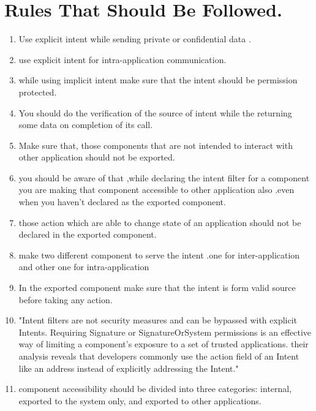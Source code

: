 \documentclass[11pt]{report}
\begin{document}
\section{Rules That Should Be Followed.}
\begin{enumerate}
\item Use explicit intent while sending private or confidential data .

\item use explicit intent for intra-application communication.

\item while using implicit intent make sure that the intent should be permission protected.

\item You should do the verification of the source of intent while the returning some data on completion of its call.

\item Make sure that, those components that are not intended to interact with  other application should not be exported. 

\item you should be aware of that ,while declaring the intent filter for a component you are making that component accessible
to other application also .even when you haven't declared as the exported component.

\item those action which are able to change state of an application should not be declared in the exported component.

\item make two different component to serve the intent .one for inter-application and other one for intra-application

\item In the exported component make sure that the intent is form valid source before taking any action.
 
\item "Intent filters are not security measures and can be bypassed with explicit Intents. Requiring Signature or SignatureOrSystem permissions is an effective
way of limiting a component's exposure to a set of trusted applications. their analysis reveals that developers commonly use the action field of an Intent like
an address instead of explicitly addressing the Intent."\cite{analyZING}

\item component accessibility should be divided into three categories: internal, exported to the system only, and exported to
other applications.\cite{analyZING}

\end{enumerate}
\end{document}
